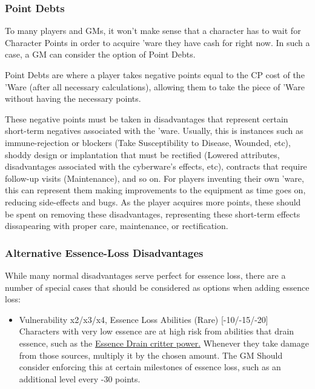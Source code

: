 \begin{multicols*}{3}
	\subsubsection{Point Debts}
	
	To many players and GMs, it won't make sense that a character has to wait for Character Points in order to acquire 'ware they have cash for right now. In such a case, a GM can consider the option of Point Debts.
	
	Point Debts are where a player takes negative points equal to the CP cost of the 'Ware (after all necessary calculations), allowing them to take the piece of 'Ware without having the necessary points. 
	
	These negative points must be taken in disadvantages that represent certain short-term negatives associated with the 'ware. Usually, this is instances such as immune-rejection or blockers (Take Susceptibility to Disease, Wounded, etc), shoddy design or implantation that must be rectified (Lowered attributes, disadvantages associated with the cyberware's effects, etc), contracts that require follow-up visits (Maintenance), and so on. For players inventing their own 'ware, this can represent them making improvements to the equipment as time goes on, reducing side-effects and bugs. As the player acquires more points, these should be spent on removing these disadvantages, representing these short-term effects dissapearing with proper care, maintenance, or rectification.
	
	\subsubsection{Alternative Essence-Loss Disadvantages}
	
	While many normal disadvantages serve perfect for essence loss, there are a number of special cases that should be considered as options when adding essence loss:
	
	\begin{itemize}
		\itemsep 0pt
		\item Vulnerability x2/x3/x4, Essence Loss Abilities (Rare) [-10/-15/-20] \newline
		Characters with very low essence are at high risk from abilities that drain essence, such as the \hyperref[essence_drain]{Essence Drain critter power.} Whenever they take damage from those sources, multiply it by the chosen amount. The GM Should consider enforcing this at certain milestones of essence loss, such as an additional level every -30 points.
	\end{itemize}
	

\end{multicols*}
